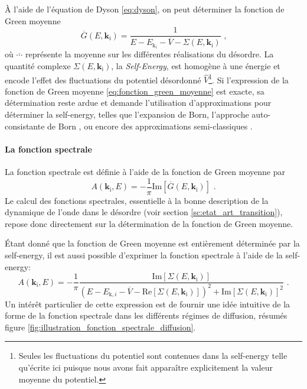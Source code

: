 À l'aide de l'équation de Dyson \ref{eq:dyson}, on peut déterminer la fonction de Green moyenne 
\begin{equation}
\overline{G}(E,\mathbf{k}_{\mathrm{i}})=\frac{1}{E-E_{\mathrm{k}_i}-\overline{V}-\Sigma(E,\mathbf{k}_{\mathrm{i}})} \text{ ,}
\label{eq:fonction_green_moyenne}
\end{equation}
où $\overline{\cdots}$ représente la moyenne sur les différentes réalisations du désordre. La quantité complexe $\Sigma(E,\mathbf{k}_{\mathrm{i}})$, la \emph{Self-Energy}, est homogène à une énergie et encode l'effet des fluctuations du potentiel désordonné $\hat{V}$\footnote{Seules les fluctuations du potentiel sont contenues dans la self-energy telle qu'écrite ici puisque nous avons fait apparaître explicitement la valeur moyenne du potentiel.}. Si l'expression de la fonction de Green moyenne \ref{eq:fonction_green_moyenne} est exacte, sa détermination reste ardue et demande l'utilisation d'approximations pour déterminer la self-energy, telles que l'expansion de Born\citep{kuhn2007coherent}\citep{lugan2009one}, l'approche auto-consistante de Born \citep{skipetrov2008anderson}\citep{yedjour2010diffusion}, ou encore des approximations semi-classiques \citep{trappe2015semiclassical}\citep{prat2016semiclassical}. 


\paragraph*{La fonction spectrale}
La fonction spectrale est définie à l'aide de la fonction de Green moyenne par
\begin{equation}
A(\mathbf{k}_{\mathrm{i}},E)= -\frac{1}{\pi} \mathrm{Im}[\overline{G}(E,\mathbf{k}_{\mathrm{i}})] \text{ .}
\end{equation}
Le calcul des fonctions spectrales, essentielle à la bonne description de la dynamique de l'onde dans le désordre (voir section \ref{sc:etat_art_transition}), repose donc directement sur la détermination de la fonction de Green moyenne.

Étant donné que la fonction de Green moyenne est entièrement déterminée par la self-energy, il est aussi possible d'exprimer la fonction spectrale à l'aide de la self-energy:
\begin{equation}
A(\mathbf{k}_{\mathrm{i}},E)=-\frac{1}{\pi}\frac{\mathrm{Im}[\Sigma(E,\mathbf{k}_{\mathrm{i}})]}{(E-E_{\mathrm{k},i}-\overline{V}-\mathrm{Re}[\Sigma(E,\mathbf{k}_{\mathrm{i}})])^2+\mathrm{Im}[\Sigma(E,\mathbf{k}_{\mathrm{i}})]^2} \text{ .}
\label{eq:fonction_spectrale_self_energy}
\end{equation}
Un intérêt particulier de cette expression est de fournir une idée intuitive de la forme de la fonction spectrale dans les différents régimes de diffusion, résumés figure \ref{fig:illustration_fonction_spectrale_diffusion}. 

